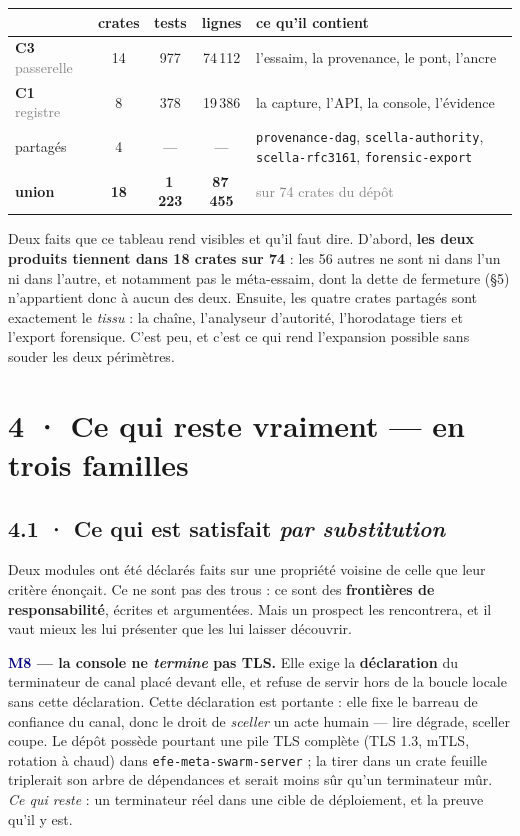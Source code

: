 \documentclass[10pt]{article}
\newcommand{\sz}[1]{\textcolor{grey}{\small\textsf{#1}}}
\newcommand{\code}[1]{\texttt{\small #1}}
\newcommand{\mm}[1]{\textbf{\textcolor{navy}{#1}}}
\begin{document}
\begin{center}\small
\renewcommand{\arraystretch}{1.24}
\begin{tabular}{@{}>{\raggedright\arraybackslash}p{3.2cm} c c c >{\raggedright\arraybackslash}p{7.4cm}@{}}
\toprule
& \textbf{crates} & \textbf{tests} & \textbf{lignes} & \textbf{ce qu'il contient} \\
\midrule
\textbf{C3} \sz{passerelle} & 14 & 977 & 74\,112 & l'essaim, la provenance, le pont, l'ancre \\
\textbf{C1} \sz{registre} & 8 & 378 & 19\,386 & la capture, l'API, la console, l'évidence \\
\midrule
partagés & 4 & --- & --- & \code{provenance-dag}, \code{scella-authority}, \code{scella-rfc3161}, \code{forensic-export} \\
\textbf{union} & \textbf{18} & \textbf{1\,223} & \textbf{87\,455} & \sz{sur 74 crates du dépôt} \\
\bottomrule
\end{tabular}
\end{center}

Deux faits que ce tableau rend visibles et qu'il faut dire. D'abord, \textbf{les deux produits tiennent
dans 18 crates sur 74} : les 56 autres ne sont ni dans l'un ni dans l'autre, et notamment pas le
méta-essaim, dont la dette de fermeture (§5) n'appartient donc à aucun des deux. Ensuite, les quatre
crates partagés sont exactement le \emph{tissu} : la chaîne, l'analyseur d'autorité, l'horodatage
tiers et l'export forensique. C'est peu, et c'est ce qui rend l'expansion possible sans souder les
deux périmètres.

\section{4 · Ce qui reste vraiment --- en trois familles}

\subsection{4.1 · Ce qui est satisfait \emph{par substitution}}

Deux modules ont été déclarés faits sur une propriété voisine de celle que leur critère énonçait. Ce
ne sont pas des trous : ce sont des \textbf{frontières de responsabilité}, écrites et argumentées.
Mais un prospect les rencontrera, et il vaut mieux les lui présenter que les lui laisser découvrir.

\textbf{\mm{M8} --- la console ne \emph{termine} pas TLS.} Elle exige la \textbf{déclaration} du
terminateur de canal placé devant elle, et refuse de servir hors de la boucle locale sans cette
déclaration. Cette déclaration est portante : elle fixe le barreau de confiance du canal, donc le
droit de \emph{sceller} un acte humain --- lire dégrade, sceller coupe. Le dépôt possède pourtant une
pile TLS complète (TLS 1.3, mTLS, rotation à chaud) dans \code{efe-meta-swarm-server} ; la tirer dans
un crate feuille triplerait son arbre de dépendances et serait moins sûr qu'un terminateur mûr. \\
\emph{Ce qui reste} : un terminateur réel dans une cible de déploiement, et la preuve qu'il y est.
\end{document}
